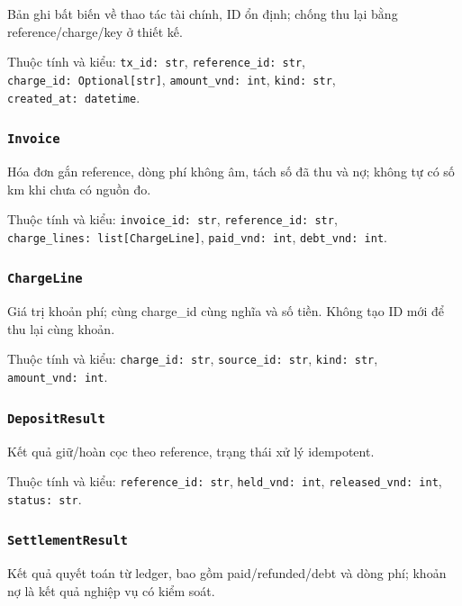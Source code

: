 \documentclass[11pt,a4paper]{article}
\begin{document}
Bản ghi bất biến về thao tác tài chính, ID ổn định; chống thu lại bằng
reference/charge/key ở thiết kế.

Thuộc tính và kiểu: \texttt{tx\_id:\ str}, \texttt{reference\_id:\ str},
\texttt{charge\_id:\ Optional{[}str{]}}, \texttt{amount\_vnd:\ int},
\texttt{kind:\ str}, \texttt{created\_at:\ datetime}.

\hypertarget{invoice}{%
\subsubsection{\texorpdfstring{\texttt{Invoice}}{Invoice}}\label{invoice}}

Hóa đơn gắn reference, dòng phí không âm, tách số đã thu và nợ; không tự
có số km khi chưa có nguồn đo.

Thuộc tính và kiểu: \texttt{invoice\_id:\ str},
\texttt{reference\_id:\ str},
\texttt{charge\_lines:\ list{[}ChargeLine{]}}, \texttt{paid\_vnd:\ int},
\texttt{debt\_vnd:\ int}.

\hypertarget{chargeline}{%
\subsubsection{\texorpdfstring{\texttt{ChargeLine}}{ChargeLine}}\label{chargeline}}

Giá trị khoản phí; cùng charge\_id cùng nghĩa và số tiền. Không tạo ID
mới để thu lại cùng khoản.

Thuộc tính và kiểu: \texttt{charge\_id:\ str},
\texttt{source\_id:\ str}, \texttt{kind:\ str},
\texttt{amount\_vnd:\ int}.

\hypertarget{depositresult}{%
\subsubsection{\texorpdfstring{\texttt{DepositResult}}{DepositResult}}\label{depositresult}}

Kết quả giữ/hoàn cọc theo reference, trạng thái xử lý idempotent.

Thuộc tính và kiểu: \texttt{reference\_id:\ str},
\texttt{held\_vnd:\ int}, \texttt{released\_vnd:\ int},
\texttt{status:\ str}.

\hypertarget{settlementresult}{%
\subsubsection{\texorpdfstring{\texttt{SettlementResult}}{SettlementResult}}\label{settlementresult}}

Kết quả quyết toán từ ledger, bao gồm paid/refunded/debt và dòng phí;
khoản nợ là kết quả nghiệp vụ có kiểm soát.
\end{document}
